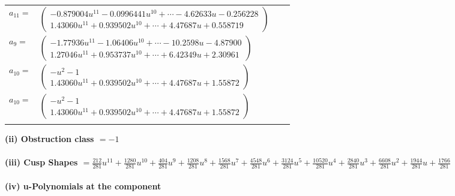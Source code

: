 \documentclass[1p]{elsarticle_modified}
\theoremstyle{definition}
\begin{document}
\begin{tabular}{m{7pt} m{180pt} m{7pt} m{180pt} }
\flushright $a_{11}=$&$\begin{pmatrix}-0.879004 u^{11}-0.0996441 u^{10}+\cdots-4.62633 u-0.256228\\1.43060 u^{11}+0.939502 u^{10}+\cdots+4.47687 u+0.558719\end{pmatrix}$ \\
\flushright $a_{9}=$&$\begin{pmatrix}-1.77936 u^{11}-1.06406 u^{10}+\cdots-10.2598 u-4.87900\\1.27046 u^{11}+0.953737 u^{10}+\cdots+6.42349 u+2.30961\end{pmatrix}$ \\
\flushright $a_{10}=$&$\begin{pmatrix}- u^2-1\\1.43060 u^{11}+0.939502 u^{10}+\cdots+4.47687 u+1.55872\end{pmatrix}$\\ \flushright $a_{10}=$&$\begin{pmatrix}- u^2-1\\1.43060 u^{11}+0.939502 u^{10}+\cdots+4.47687 u+1.55872\end{pmatrix}$\\&\end{tabular}
\flushleft \textbf{(ii) Obstruction class $= -1$}\\~\\
\flushleft \textbf{(iii) Cusp Shapes $= \frac{212}{281} u^{11}+\frac{1280}{281} u^{10}+\frac{404}{281} u^9+\frac{1208}{281} u^8+\frac{1568}{281} u^7+\frac{4548}{281} u^6+\frac{3124}{281} u^5+\frac{10520}{281} u^4+\frac{2840}{281} u^3+\frac{6608}{281} u^2+\frac{1944}{281} u+\frac{1766}{281}$}\\~\\
\newpage\renewcommand{\arraystretch}{1}
\flushleft \textbf{(iv) u-Polynomials at the component}\newline \\
\end{document}
